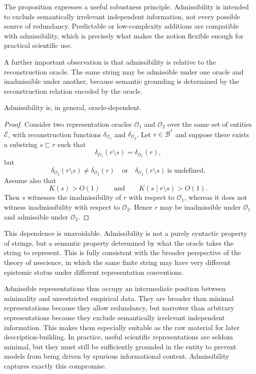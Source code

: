 The proposition expresses a useful robustness principle. Admissibility is intended to exclude semantically irrelevant independent information, not every possible source of redundancy. Predictable or low-complexity additions are compatible with admissibility, which is precisely what makes the notion flexible enough for practical scientific use.

A further important observation is that admissibility is relative to the reconstruction oracle. The same string may be admissible under one oracle and inadmissible under another, because semantic grounding is determined by the reconstruction relation encoded by the oracle.

\begin{proposition}
Admissibility is, in general, oracle-dependent.
\end{proposition}

\begin{proof}
Consider two representation oracles $\mathcal O_1$ and $\mathcal O_2$ over the same set of entities $\mathcal E$, with reconstruction functions $\delta_{\mathcal O_1}$ and $\delta_{\mathcal O_2}$. Let $r\in\mathcal{B}^\ast$ and suppose there exists a substring $s\sqsubset r$ such that
\[
\delta_{\mathcal O_1}(r\setminus s)=\delta_{\mathcal O_1}(r),
\]
but
\[
\delta_{\mathcal O_2}(r\setminus s)\neq\delta_{\mathcal O_2}(r)
\quad\text{or}\quad
\delta_{\mathcal O_2}(r\setminus s)\ \text{is undefined}.
\]
Assume also that
\[
K(s)>O(1)
\qquad\text{and}\qquad
K(s\mid r\setminus s)>O(1).
\]
Then $s$ witnesses the inadmissibility of $r$ with respect to $\mathcal O_1$, whereas it does not witness inadmissibility with respect to $\mathcal O_2$. Hence $r$ may be inadmissible under $\mathcal O_1$ and admissible under $\mathcal O_2$.
\end{proof}

This dependence is unavoidable. Admissibility is not a purely syntactic property of strings, but a semantic property determined by what the oracle takes the string to represent. This is fully consistent with the broader perspective of the theory of nescience, in which the same finite string may have very different epistemic status under different representation conventions.

Admissible representations thus occupy an intermediate position between minimality and unrestricted empirical data. They are broader than minimal representations because they allow redundancy, but narrower than arbitrary representations because they exclude semantically irrelevant independent information. This makes them especially suitable as the raw material for later description-building. In practice, useful scientific representations are seldom minimal, but they must still be sufficiently grounded in the entity to prevent models from being driven by spurious informational content. Admissibility captures exactly this compromise.

